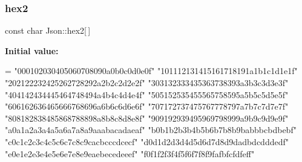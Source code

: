 \subsubsection{\texorpdfstring{hex2}{hex2}}
{\footnotesize\ttfamily const char Json\+::hex2\mbox{[}$\,$\mbox{]}\hspace{0.3cm}{\ttfamily [static]}}

{\bfseries Initial value\+:}
\begin{DoxyCode}
= \textcolor{stringliteral}{"000102030405060708090a0b0c0d0e0f"}
                           \textcolor{stringliteral}{"101112131415161718191a1b1c1d1e1f"}
                           \textcolor{stringliteral}{"202122232425262728292a2b2c2d2e2f"}
                           \textcolor{stringliteral}{"303132333435363738393a3b3c3d3e3f"}
                           \textcolor{stringliteral}{"404142434445464748494a4b4c4d4e4f"}
                           \textcolor{stringliteral}{"505152535455565758595a5b5c5d5e5f"}
                           \textcolor{stringliteral}{"606162636465666768696a6b6c6d6e6f"}
                           \textcolor{stringliteral}{"707172737475767778797a7b7c7d7e7f"}
                           \textcolor{stringliteral}{"808182838485868788898a8b8c8d8e8f"}
                           \textcolor{stringliteral}{"909192939495969798999a9b9c9d9e9f"}
                           \textcolor{stringliteral}{"a0a1a2a3a4a5a6a7a8a9aaabacadaeaf"}
                           \textcolor{stringliteral}{"b0b1b2b3b4b5b6b7b8b9babbbcbdbebf"}
                           \textcolor{stringliteral}{"c0c1c2c3c4c5c6c7c8c9cacbcccdcecf"}
                           \textcolor{stringliteral}{"d0d1d2d3d4d5d6d7d8d9dadbdcdddedf"}
                           \textcolor{stringliteral}{"e0e1e2e3e4e5e6e7e8e9eaebecedeeef"}
                           \textcolor{stringliteral}{"f0f1f2f3f4f5f6f7f8f9fafbfcfdfeff"}
\end{DoxyCode}
